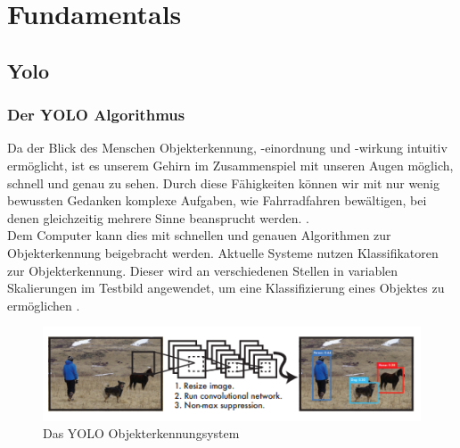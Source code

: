 \chapter{Fundamentals}
\label{ch:fundamentals}


\section{Yolo}

\subsection{Der YOLO Algorithmus \label{subsec:YOLO_Alg}} 
	{Da der Blick des Menschen Objekterkennung, -einordnung und -wirkung intuitiv ermöglicht, ist es unserem Gehirn im Zusammenspiel mit unseren Augen möglich, schnell und genau zu sehen. Durch diese Fähigkeiten können wir mit nur wenig bewussten Gedanken komplexe Aufgaben, wie Fahrradfahren bewältigen, bei denen gleichzeitig mehrere Sinne beansprucht werden. \citep{Redmon2016}. \\
	Dem Computer kann dies mit schnellen und genauen Algorithmen zur Objekterkennung beigebracht werden. Aktuelle Systeme nutzen Klassifikatoren zur Objekterkennung. Dieser wird an verschiedenen Stellen in variablen Skalierungen im Testbild angewendet, um eine Klassifizierung eines Objektes zu ermöglichen \citep{Redmon2016}. \\ 
	
	\begin{figure}[ht]
		\centering
		\includegraphics*[scale = 1, keepaspectratio, trim=2 2 2 2 ]{images/YOLO/YOLO_detection_system.png}
		\caption[Das YOLO Objekterkennungsystem]{Das YOLO Objekterkennungsystem \citep{Redmon2016}}
		\label{YOLO_Objectdetection}
 	\end{figure}
	
}
